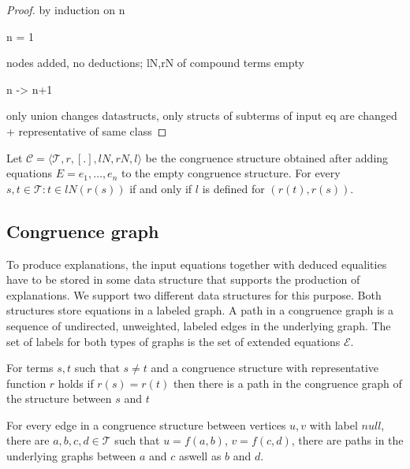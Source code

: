 \begin{proof}

by induction on n

n = 1

nodes added, no deductions; lN,rN of compound terms empty 

n -> n+1

only union changes datastructs,
only structs of subterms of input eq are changed + representative of same class

\end{proof}

\begin{proposition}

Let $\mathcal{C} = \langle \mathcal{T},r,[.], lN, rN, l \rangle$ be the congruence structure obtained after adding equations $E = e_1, \ldots, e_n$ to the empty congruence structure.
For every $s,t \in \mathcal{T}: t \in lN(r(s))$ if and only if $l$ is defined for $(r(t),r(s))$.

\end{proposition}

\subsection*{Congruence graph}

To produce explanations, the input equations together with deduced equalities have to be stored in some data structure that supports the production of explanations.
We support two different data structures for this purpose.
Both structures store equations in a labeled graph.
A path in a congruence graph is a sequence of undirected, unweighted, labeled edges in the underlying graph.
The set of labels for both types of graphs is the set of extended equations $\mathcal{E}$.

\begin{invariant}[Paths]

For terms $s, t$ such that $s \neq t$ and a congruence structure with representative function $r$ holds if $r(s) = r(t)$ then there is a path in the congruence graph of the structure between $s$ and $t$

\end{invariant}

\begin{invariant}[Insert]

For every edge in a congruence structure between vertices $u,v$ with label $null$, 
there are $a,b,c,d \in \mathcal{T}$ such that $u = f(a,b)$, $v = f(c,d)$, 
there are paths in the underlying graphs between $a$ and $c$ aswell as $b$ and $d$.

\end{invariant}



